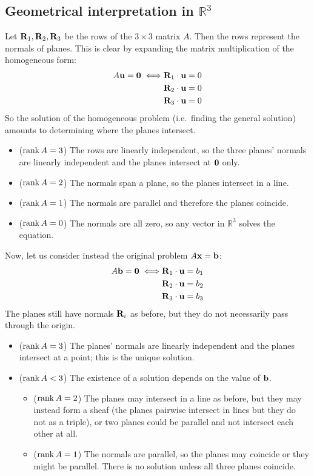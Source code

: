 \subsection{Geometrical interpretation in \(\mathbb R^3\)}
Let \(\vb R_1, \vb R_2, \vb R_3\) be the rows of the \(3 \times 3\) matrix \(A\).
Then the rows represent the normals of planes.
This is clear by expanding the matrix multiplication of the homogeneous form:
\begin{align*}
	A\vb u = \vb 0 \iff & \vb R_1 \cdot \vb u = 0 \\
	                    & \vb R_2 \cdot \vb u = 0 \\
	                    & \vb R_3 \cdot \vb u = 0
\end{align*}
So the solution of the homogeneous problem (i.e.\ finding the general solution) amounts to determining where the planes intersect.
\begin{itemize}
	\item (\(\rank A = 3\)) The rows are linearly independent, so the three planes' normals are linearly independent and the planes intersect at \(\vb 0\) only.
	\item (\(\rank A = 2\)) The normals span a plane, so the planes intersect in a line.
	\item (\(\rank A = 1\)) The normals are parallel and therefore the planes coincide.
	\item (\(\rank A = 0\)) The normals are all zero, so any vector in \(\mathbb R^3\) solves the equation.
\end{itemize}
Now, let us consider instead the original problem \(A \vb x = \vb b\):
\begin{align*}
	A\vb b = \vb 0 \iff & \vb R_1 \cdot \vb u = b_1 \\
	                    & \vb R_2 \cdot \vb u = b_2 \\
	                    & \vb R_3 \cdot \vb u = b_3
\end{align*}
The planes still have normals \(\vb R_i\) as before, but they do not necessarily pass through the origin.
\begin{itemize}
	\item (\(\rank A = 3\)) The planes' normals are linearly independent and the planes intersect at a point; this is the unique solution.
	\item (\(\rank A < 3\)) The existence of a solution depends on the value of \(\vb b\).
	      \begin{itemize}
		      \item (\(\rank A = 2\)) The planes may intersect in a line as before, but they may instead form a sheaf (the planes pairwise intersect in lines but they do not as a triple), or two planes could be parallel and not intersect each other at all.
		      \item (\(\rank A = 1\)) The normals are parallel, so the planes may coincide or they might be parallel.
		            There is no solution unless all three planes coincide.
	      \end{itemize}
\end{itemize}
